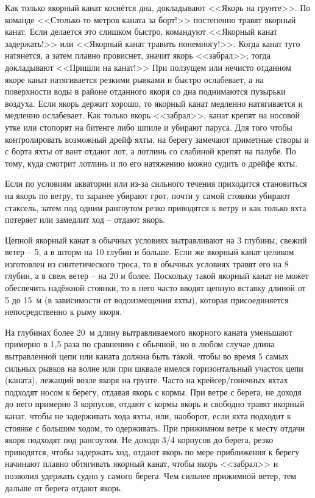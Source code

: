 Как только якорный канат коснётся дна, докладывают <<Якорь на грунте>>. По команде <<Столько-то метров каната за борт!>> постепенно травят якорный канат. Если делается это слишком быстро, командуют <<Якорный канат задержать!>> или <<Якорный канат травить понемногу!>>. Когда канат туго натянется, а затем плавно провиснет, значит якорь <<забрал>>; тогда докладывают <<Пришли на канат!>> При ползущем или нечисто отданном якоре канат натягивается резкими рывками и быстро ослабевает, а на поверхности воды в районе отданного якоря со дна поднимаются пузырьки воздуха. Если якорь держит хорошо, то якорный канат медленно натягивается и медленно ослабевает. Как только якорь <<забрал>>, канат крепят на носовой утке или стопорят на битенге либо шпиле и убирают паруса. Для того чтобы контролировать возможный дрейф яхты, на берегу замечают приметные створы и с борта яхты от вант отдают лот, а лотлинь со слабиной крепят на палубе. По тому, куда смотрит лотлинь и по его натяжению можно судить о дрейфе яхты.

Если по условиям акватории или из-за сильного течения приходится становиться на якорь по ветру, то заранее убирают грот, почти у самой стоянки убирают стаксель, затем под одним рангоутом резко приводятся к ветру и как только яхта потеряет или замедлит ход \--- отдают якорь.

Цепной якорный канат в обычных условиях вытравливают на 3 глубины, свежий ветер \--- 5, а в шторм на 10 глубин и больше. Если же якорный канат целиком изготовлен из синтетического троса, то в обычных условиях травят его на 8 глубин, а в свеж ветер \--- на 20 и более. Поскольку такой якорный канат не может обеспечить надёжной стоянки, то в него часто вводят цепную вставку длиной от 5 до 15~м (в зависимости от водоизмещения яхты), которая присоединяется непосредственно к рыму якоря.

На глубинах более 20~м длину вытравливаемого якорного каната уменьшают примерно в 1,5 раза по сравнению с обычной, но в любом случае длина вытравленной цепи или каната должна быть такой, чтобы во время 5 самых сильных рывков на волне или при шквале имелся горизонтальный участок цепи (каната), лежащий возле якоря на грунте. Часто на крейсер\-/гоночных яхтах подходят носом к берегу, отдавая якорь с кормы. При ветре с берега, не доходя до него примерно 3 корпусов, отдают с кормы якорь и свободно травят якорный канат, чтобы не задерживать хода яхты, или, наоборот, если яхта подходит к стоянке с большим ходом, то одерживать. При прижимном ветре к месту отдачи якоря подходят под рангоутом. Не доходя 3\-/4 корпусов до берега, резко приводятся, чтобы задержать ход, отдают якорь по мере приближения к берегу начинают плавно обтягивать якорный канат, чтобы якорь <<забрал>> и позволил удержать судно у самого берега. Чем сильнее прижимной ветер, тем дальше от берега отдают якорь.

